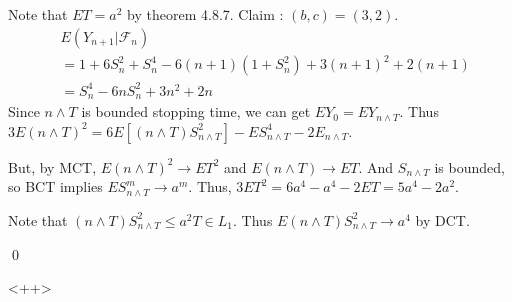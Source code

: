 \begin{problem}[4.8.7] \hfill

	Note that $ET = a^2$ by theorem 4.8.7.
	Claim : $(b, c) = (3, 2)$.
	\[
		\begin{split}
			& E(Y_{n+1}|\mathcal{F}_n) \\
			& = 1+6S_n^2 +S_n^4 -6(n+1)(1+S_n^2) + 3(n+1)^2 +2(n+1) \\
			& = S_n^4 -6n S_n^2 + 3n^2 +2n
		\end{split}
	\]
	Since $n\wedge T$ is bounded stopping time, we can get $EY_0 = EY_{n\wedge T}$.
	Thus $3E(n\wedge T)^2 = 6E\left[ (n\wedge T)S_{n\wedge T}^2 \right] - ES_{n\wedge T}^4 - 2E_{n\wedge T}$.
	
	But, by MCT, $E(n\wedge T)^2 \rightarrow ET^2$ and $E(n\wedge T) \rightarrow ET$.
	And $S_{n\wedge T}$ is bounded, so BCT implies $ES_{n\wedge T}^m \rightarrow a^m$.
	Thus, $3ET^2 = 6a^4 - a^4 - 2ET = 5a^4 -2a^2$.

	Note that $(n\wedge T)S_{n\wedge T}^2 \leq a^2T \in L_1$. Thus $E(n\wedge T)S_{n\wedge T}^2 \rightarrow a^4$ by DCT.

	\qed	
\end{problem}

\begin{problem}[4.8.9] \hfill
	
\end{problem}<++>
